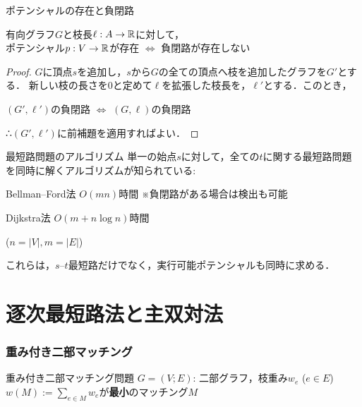 \documentclass[14pt,aspectratio=169,xcolor=dvipsnames,table,onlytextwidth,dvipdfmx]{beamer}
\begin{document}
\begin{frame}{ポテンシャルの存在と負閉路}
    
    \begin{theorem}
        有向グラフ$G$と枝長$\ell: A \to \mathbb{R}$に対して，\\
        ポテンシャル$p: V \to \mathbb{R}$が存在 $\iff$ 負閉路が存在しない
    \end{theorem}
    \begin{proof}
        $G$に頂点$s$を追加し，$s$から$G$の全ての頂点へ枝を追加したグラフを$G'$とする．
        新しい枝の長さを$0$と定めて$\ell$を拡張した枝長を，$\ell'$とする．このとき，
        \begin{center}
        $(G', \ell')$の負閉路 $\iff$ $(G, \ell)$の負閉路
        \end{center}

        ∴$(G', \ell')$に前補題を適用すればよい．
    \end{proof}
\end{frame}

\begin{frame}{最短路問題のアルゴリズム}
    単一の始点$s$に対して，全ての$t$に関する最短路問題を同時に解くアルゴリズムが知られている:  

    \bigskip
    \begin{description}
        \setlength{\itemsep}{1em}
        \item[一般の枝長$\ell$:] \alert{Bellman--Ford法} $O(mn)$時間  {\hfill \footnotesize ※負閉路がある場合は検出も可能}
        \item[非負の枝長$\ell$:] \alert{Dijkstra法} $O(m + n \log n)$時間
    \end{description}
    {\footnotesize\hfill ($n = |V|, m = |E|$)}

    \bigskip
    これらは，$s$--$t$最短路だけでなく，実行可能ポテンシャルも同時に求める．
\end{frame}

\section{逐次最短路法と主双対法}
\begin{frame}[label=w-bipartite]
    \frametitle{重み付き二部マッチング}

    \begin{block}{重み付き二部マッチング問題}
         $G=(V; E)$: 二部グラフ，枝重み$w_e$ ($e \in E$) \\
         $w(M) := \sum_{e\in M}w_e$が\textbf{最小}のマッチング$M$
    \end{block}
\end{frame}
\end{document}
